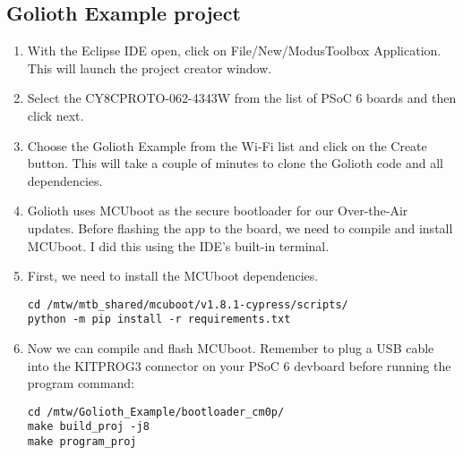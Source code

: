 \documentclass[journal,5pt,twocolumn]{IEEEtran}
\begin{document}
 \subsection{\textbf{Golioth Example project}}
\begin{enumerate}
\item With the Eclipse IDE open, click on File/New/ModusToolbox Application. This will launch the project creator window.
\item Select the CY8CPROTO-062-4343W from the list of PSoC 6 boards and then click next.
\item Choose the Golioth Example from the Wi-Fi list and click on the Create button. This will take a couple of minutes to clone the Golioth code and all dependencies.
\item Golioth uses MCUboot as the secure bootloader for our Over-the-Air updates. Before flashing the app to the board, we need to compile and install MCUboot. I did this using the IDE's built-in terminal.
\item First, we need to install the MCUboot dependencies.
 \begin{lstlisting}
cd /mtw/mtb_shared/mcuboot/v1.8.1-cypress/scripts/
python -m pip install -r requirements.txt
 \end{lstlisting}
    
\item Now we can compile and flash MCUboot. Remember to plug a USB cable into the KITPROG3 connector on your PSoC 6 devboard before running the program command:
 \begin{lstlisting}
cd /mtw/Golioth_Example/bootloader_cm0p/
make build_proj -j8
make program_proj
 \end{lstlisting}
 
 \end{enumerate}
 
\end{document}
